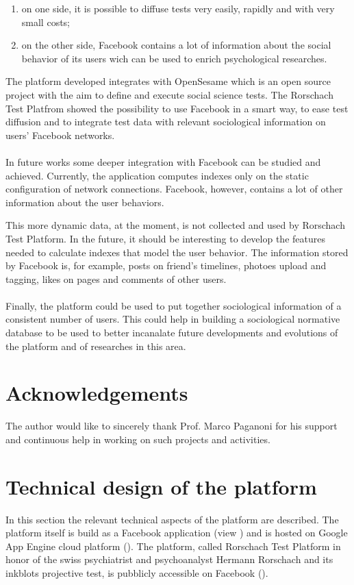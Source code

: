 \begin{enumerate}
\item on one side, it is possible to diffuse tests very easily, rapidly and with very small costs;
\item on the other side, Facebook contains a lot of information about the social behavior of its users wich can be used to enrich psychological researches.
\end{enumerate}

The platform developed integrates with OpenSesame which is an open source project with the aim to define and execute social science tests.
The Rorschach Test Platfrom showed the possibility to use Facebook in a smart way, to ease test diffusion and to integrate test data with relevant sociological
information on users' Facebook networks.\\
\\
In future works some deeper integration with Facebook can be studied and achieved.
Currently, the application computes indexes only on the static configuration of network connections.
Facebook, however, contains a lot of other information about the user behaviors.

This more dynamic data, at the moment, is not collected and used by Rorschach Test Platform.
In the future, it should be interesting to develop the features needed to calculate indexes that model the user behavior.
The information stored by Facebook is, for example, posts on friend's timelines, photoes upload and tagging, likes on pages and comments of other users.\\
\\
Finally, the platform could be used to put together sociological information of a consistent number of users.
This could help in building a sociological normative database to be used to better incanalate future developments and evolutions of the platform and of researches in this area.

\section*{Acknowledgements}
The author would like to sincerely thank Prof. Marco Paganoni for his support and continuous help in working on such projects and activities.

\appendix
\label{sec:techdesign}
\section{Technical design of the platform}
In this section the relevant technical aspects of the platform are described.
The platform itself is build as a Facebook application (view \cite{Facebook-2011}) and is hosted on Google App Engine cloud platform (\cite{GAE-2011}).
The platform, called Rorschach Test Platform in honor of the swiss psychiatrist and psychoanalyst Hermann Rorschach and its inkblots projective test,
is pubblicly accessible on Facebook (\cite{Rorschach-2011}).

